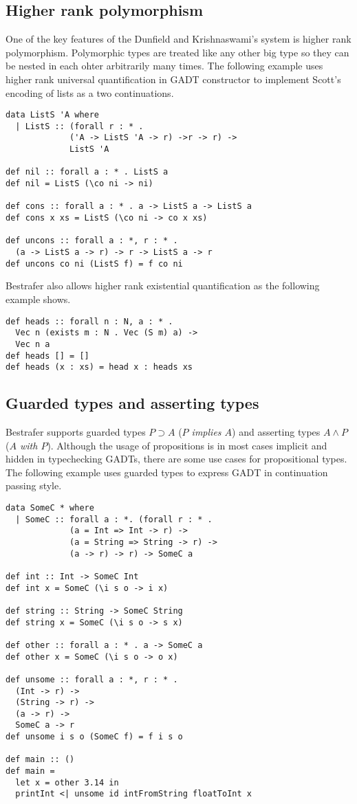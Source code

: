 \documentclass[declaration,shortabstract,english]{iithesis}
\begin{document}
\subsection*{Higher rank polymorphism}
One of the key features of the Dunfield and Krishnaswami's system is higher rank polymorphism.
Polymorphic types are treated like any other big type so they can be nested in each ohter arbitrarily
many times. The following example uses higher rank universal quantification in GADT constructor
to implement Scott's encoding of lists as a two continuations\cite{rankNtypes}.
\begin{verbatim}
data ListS 'A where
  | ListS :: (forall r : * .
             ('A -> ListS 'A -> r) ->r -> r) ->
             ListS 'A

def nil :: forall a : * . ListS a
def nil = ListS (\co ni -> ni)

def cons :: forall a : * . a -> ListS a -> ListS a
def cons x xs = ListS (\co ni -> co x xs)

def uncons :: forall a : *, r : * .
  (a -> ListS a -> r) -> r -> ListS a -> r
def uncons co ni (ListS f) = f co ni
\end{verbatim}
Bestrafer also allows higher rank existential quantification as the following example shows.
\begin{verbatim}
def heads :: forall n : N, a : * .
  Vec n (exists m : N . Vec (S m) a) ->
  Vec n a
def heads [] = []
def heads (x : xs) = head x : heads xs
\end{verbatim}

\subsection*{Guarded types and asserting types}
Bestrafer supports guarded types $P \supset A $ (\textit{$P$ implies $A$})
and asserting types $A \wedge  P$ (\textit{$A$ with $P$}).
Although the usage of propositions is in most cases implicit and hidden in typechecking GADTs,
there are some use cases for propositional types.
The following example uses guarded types to express GADT in continuation passing style\cite{rankNtypes}.

\begin{verbatim}
data SomeC * where
  | SomeC :: forall a : *. (forall r : * .
             (a = Int => Int -> r) ->
             (a = String => String -> r) ->
             (a -> r) -> r) -> SomeC a

def int :: Int -> SomeC Int
def int x = SomeC (\i s o -> i x)

def string :: String -> SomeC String
def string x = SomeC (\i s o -> s x)

def other :: forall a : * . a -> SomeC a
def other x = SomeC (\i s o -> o x)

def unsome :: forall a : *, r : * .
  (Int -> r) ->
  (String -> r) ->
  (a -> r) ->
  SomeC a -> r
def unsome i s o (SomeC f) = f i s o

def main :: ()
def main =
  let x = other 3.14 in
  printInt <| unsome id intFromString floatToInt x
\end{verbatim}
\end{document}
